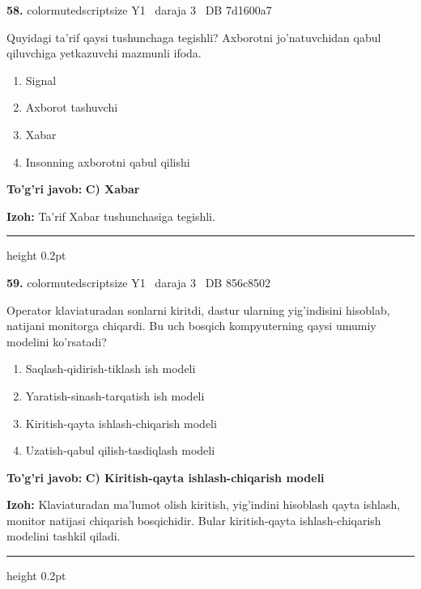 \documentclass[10pt,a4paper,oneside]{article}
\begin{document}
\noindent\textbf{\color{ink}58.}  {color{muted}scriptsize Y1 \textbullet\ daraja 3 \textbullet\ DB 7d1600a7}
\par
Quyidagi ta'rif qaysi tushunchaga tegishli? Axborotni jo'natuvchidan qabul qiluvchiga yetkazuvchi mazmunli ifoda.
\begin{enumerate}[label=\Alph*),leftmargin=9mm]
\item Signal
\item Axborot tashuvchi
\item Xabar
\item Insonning axborotni qabul qilishi
\end{enumerate}
\begin{tcolorbox}[enhanced,breakable,colback=teal!4,colframe=teal!50!black,boxrule=0.5pt,arc=1.1mm,left=3mm,right=3mm,top=1.7mm,bottom=1.7mm,before skip=2mm,after skip=2mm]
\textbf{\color{teal}To'g'ri javob:} \textbf{C) Xabar}
\par\smallskip
\textbf{Izoh:} Ta'rif Xabar tushunchasiga tegishli.
\end{tcolorbox}
\vspace{2mm}\hrule height 0.2pt \vspace{3mm}

\noindent\textbf{\color{ink}59.}  {color{muted}scriptsize Y1 \textbullet\ daraja 3 \textbullet\ DB 856c8502}
\par
Operator klaviaturadan sonlarni kiritdi, dastur ularning yig'indisini hisoblab, natijani monitorga chiqardi. Bu uch bosqich kompyuterning qaysi umumiy modelini ko'rsatadi?
\begin{enumerate}[label=\Alph*),leftmargin=9mm]
\item Saqlash-qidirish-tiklash ish modeli
\item Yaratish-sinash-tarqatish ish modeli
\item Kiritish-qayta ishlash-chiqarish modeli
\item Uzatish-qabul qilish-tasdiqlash modeli
\end{enumerate}
\begin{tcolorbox}[enhanced,breakable,colback=teal!4,colframe=teal!50!black,boxrule=0.5pt,arc=1.1mm,left=3mm,right=3mm,top=1.7mm,bottom=1.7mm,before skip=2mm,after skip=2mm]
\textbf{\color{teal}To'g'ri javob:} \textbf{C) Kiritish-qayta ishlash-chiqarish modeli}
\par\smallskip
\textbf{Izoh:} Klaviaturadan ma'lumot olish kiritish, yig'indini hisoblash qayta ishlash, monitor natijasi chiqarish bosqichidir. Bular kiritish-qayta ishlash-chiqarish modelini tashkil qiladi.
\end{tcolorbox}
\vspace{2mm}\hrule height 0.2pt \vspace{3mm}
\end{document}
